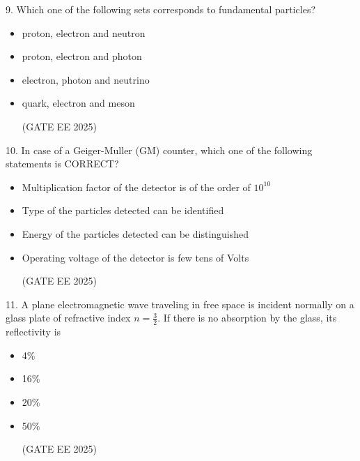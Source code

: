 \documentclass[twocolumn]{article}
\begin{document}
9. Which one of the following sets corresponds to fundamental particles?

\begin{itemize}
\item[(A)] proton, electron and neutron

\item[(B)] proton, electron and photon

\item[(C)] electron, photon and neutrino

\item[(D)] quark, electron and meson

(GATE EE 2025)
  \end{itemize}




10. In case of a Geiger-Muller (GM) counter, which one of the following statements is CORRECT?

\begin{itemize}
\item[(A)] Multiplication factor of the detector is of the order of $10^{10}$

\item[(B)] Type of the particles detected can be identified

\item[(C)] Energy of the particles detected can be distinguished

\item[(D)] Operating voltage of the detector is few tens of Volts

(GATE EE 2025)
  \end{itemize}




11. A plane electromagnetic wave traveling in free space is incident normally on a glass plate of refractive index $n = \frac{3}{2}$.  
If there is no absorption by the glass, its reflectivity is

\begin{itemize}
\item[(A)] 4\% \\
\item[(B)] 16\% \\
\item[(C)] 20\% \\
\item[(D)] 50\%

(GATE EE 2025)
  \end{itemize}
\end{document}

